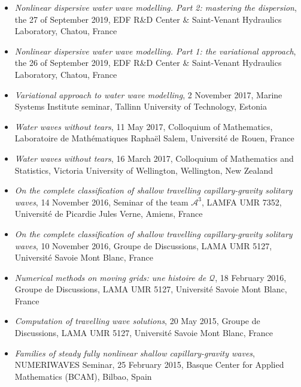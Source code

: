\documentclass[final, a4paper, oneside, 12pt]{article}
\numberwithin{equation}{section}
\begin{document}
\begin{itemize}
  \item \textit{Nonlinear dispersive water wave modelling. Part 2: mastering the dispersion}, the 27 of September 2019, EDF R\&D Center \& Saint-Venant Hydraulics Laboratory, Chatou, France

  \item \textit{Nonlinear dispersive water wave modelling. Part 1: the variational approach}, the 26 of September 2019, EDF R\&D Center \& Saint-Venant Hydraulics Laboratory, Chatou, France

  \item \textit{Variational approach to water wave modelling}, 2 November 2017, Marine Systems Institute seminar, Tallinn University of Technology, Estonia

  \item \textit{Water waves without tears}, 11 May 2017, Colloquium of Mathematics, Laboratoire de Math\'ematiques Rapha\"el Salem, Universit\'e de Rouen, France

  \item \textit{Water waves without tears}, 16 March 2017, Colloquium of Mathematics and Statistics, Victoria University of Wellington, Wellington, New Zealand

  \item \textit{On the complete classification of shallow travelling capillary-gravity solitary waves}, 14 November 2016, Seminar of the team $\mathcal{A}^3$, LAMFA UMR 7352, Universit\'e de Picardie Jules Verne, Amiens, France

  \item \textit{On the complete classification of shallow travelling capillary-gravity solitary waves}, 10 November 2016, Groupe de Discussions, LAMA UMR 5127, Universit\'e Savoie Mont Blanc, France

  \item \textit{Numerical methods on moving grids: une histoire de $\mathcal{Q}$}, 18 February 2016, Groupe de Discussions, LAMA UMR 5127, Universit\'e Savoie Mont Blanc, France

  \item \textit{Computation of travelling wave solutions}, 20 May 2015, Groupe de Discussions, LAMA UMR 5127, Universit\'e Savoie Mont Blanc, France

  \item \textit{Families of steady fully nonlinear shallow capillary-gravity waves}, NUMERIWAVES Seminar, 25 February 2015, Basque Center for Applied Mathematics (BCAM), Bilbao, Spain


\end{itemize}
\end{document}
